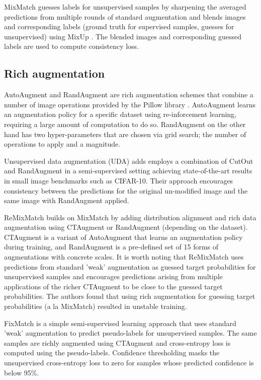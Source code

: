 \documentclass{article}
\begin{document}
MixMatch \cite{Berthelot:MixMatch} guesses labels for unsupervised samples by sharpening the
averaged predictions from multiple rounds of standard augmentation and blends images and
corresponding labels (ground truth for supervised samples, guesses for unsupervised) using 
MixUp \cite{Zhang:MixUp}. The blended images and corresponding guessed labels are used to
compute consistency loss.


\subsection{Rich augmentation}
AutoAugment \cite{Cubuk:AutoAugment} and RandAugment \cite{Cubuk:RandAugment} are rich augmentation schemes
that combine a number of image operations provided by the Pillow library \cite{Pillow}. AutoAugment learns
an augmentation policy for a specific dataset using re-inforcement learning, requiring a large amount
of computation to do so. RandAugment on the other hand has two hyper-parameters that are chosen via grid
search; the number of operations to apply and a magnitude.

Unsupervised data augmentation (UDA) \cite{Xie:UDA} adds employs a combination of CutOut \cite{Devries:Cutout}
and RandAugment \cite{Cubuk:RandAugment} in a semi-supervised setting achieving state-of-the-art
results in small image benchmarks such as CIFAR-10. Their approach encourages consistency between
the predictions for the original un-modified image and the same image with RandAugment applied.

ReMixMatch \cite{Berthelot:ReMixMatch} builds on MixMatch by adding distribution
alignment and rich data augmentation using CTAugment or RandAugment (depending on the dataset). CTAugment is a variant of AutoAugment
that learns an augmentation policy during training, and RandAugment is a pre-defined set of 15 forms of augmentations with concrete scales. It is worth noting that
ReMixMatch uses predictions from standard 'weak' augmentation as guessed target probabilities
for unsupervised samples and encourages predictions arising from multiple applications
of the richer CTAugment to be close to the guessed target probabilities. The authors found that using
rich augmentation for guessing target probabilities (a la MixMatch) resulted in unstable training.

FixMatch \cite{Sohn:FixMatch} is a simple semi-supervised learning approach that uses standard
'weak' augmentation to predict pseudo-labels for unsupervised samples. The same samples are richly
augmented using CTAugment and cross-entropy loss is computed using the pseudo-labels.
Confidence thresholding \cite{French:SelfEnsDomAdapt} masks the unsupervised
cross-entropy loss to zero for samples whose predicted confidence is below 95\%.
\end{document}
